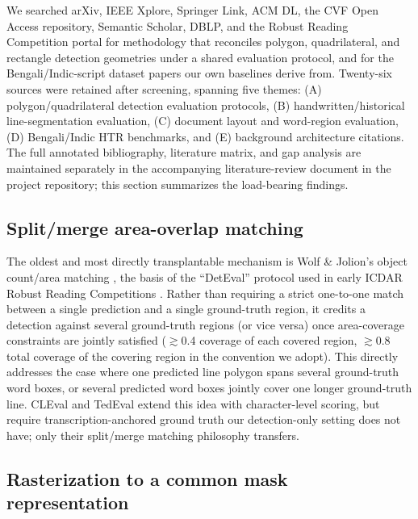 \documentclass[11pt]{article}
\begin{document}
We searched arXiv, IEEE Xplore, Springer Link, ACM DL, the CVF Open Access repository,
Semantic Scholar, DBLP, and the Robust Reading Competition portal for methodology that
reconciles polygon, quadrilateral, and rectangle detection geometries under a shared
evaluation protocol, and for the Bengali/Indic-script dataset papers our own baselines
derive from. Twenty-six sources were retained after screening, spanning five themes:
(A) polygon/quadrilateral detection evaluation protocols, (B) handwritten/historical
line-segmentation evaluation, (C) document layout and word-region evaluation, (D)
Bengali/Indic HTR benchmarks, and (E) background architecture citations. The full
annotated bibliography, literature matrix, and gap analysis are maintained separately
in the accompanying literature-review document in the project repository; this section
summarizes the load-bearing findings.

\subsection{Split/merge area-overlap matching}

The oldest and most directly transplantable mechanism is Wolf \& Jolion's object
count/area matching \cite{wolf2006detEval}, the basis of the ``DetEval'' protocol used
in early ICDAR Robust Reading Competitions \cite{shahab2011icdar2011,karatzas2013icdar2013,karatzas2015icdar2015}.
Rather than requiring a strict one-to-one match between a single prediction and a single
ground-truth region, it credits a detection against several ground-truth regions (or
vice versa) once area-coverage constraints are jointly satisfied ($\gtrsim$0.4 coverage
of each covered region, $\gtrsim$0.8 total coverage of the covering region in the
convention we adopt). This directly addresses the case where one predicted line polygon
spans several ground-truth word boxes, or several predicted word boxes jointly cover one
longer ground-truth line. CLEval \cite{baek2020cleval} and TedEval \cite{lee2019tedeval}
extend this idea with character-level scoring, but require transcription-anchored
ground truth our detection-only setting does not have; only their split/merge matching
philosophy transfers.

\subsection{Rasterization to a common mask representation}
\end{document}
